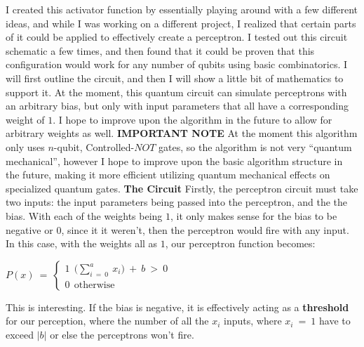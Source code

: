 \documentclass{article}
\begin{document}
I created this activator function by essentially playing around with a few different ideas, and while I was working on a different project, I realized that certain parts of it could be applied to effectively create a perceptron. I tested out this circuit schematic a few times, and then found that it could be proven that this configuration would work for any number of qubits using basic combinatorics. I will first outline the circuit, and then I will show a little bit of mathematics to support it.
\newline\newline
At the moment, this quantum circuit can simulate perceptrons with an arbitrary bias, but only with input parameters that all have a corresponding weight of $1$. I hope to improve upon the algorithm in the future to allow for arbitrary weights as well. 
\newline\newline
\textbf{IMPORTANT NOTE}
\newline\newline
At the moment this algorithm only uses $n$-qubit, Controlled-$NOT$ gates, so the algorithm is not very “quantum mechanical”, however I hope to improve upon the basic algorithm structure in the future, making it more efficient utilizing quantum mechanical effects on specialized quantum gates.
\newline\newline
\textbf{The Circuit}
\newline\newline
Firstly, the perceptron circuit must take two inputs: the input parameters being passed into the perceptron, and the the bias. With each of the weights being $1$, it only makes sense for the bias to be negative or $0$, since it it weren’t, then the perceptron would fire with any input. In this case, with the weights all as $1$, our perceptron function becomes:
\newline
\begin{center}
$P(x) \ = \ \begin{cases} \text{1} \ \ \Big( \displaystyle\sum_{i \ = \ 0}^{a} \ x_{i} \Big) \ + \ b \ > \ 0 \\ \text{0} \ \ \text{otherwise} \end{cases}$
\end{center}
\vspace{7}
This is interesting. If the bias is negative, it is effectively acting as a \textbf{threshold} for our perception, where the number of all the $x_i$ inputs, where $x_i \ = \ 1$ have to exceed $| b |$ or else the perceptrons won’t fire.
\end{document}
